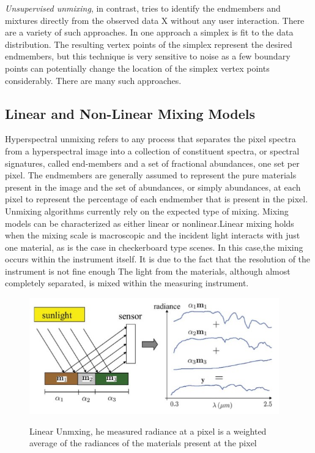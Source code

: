 \documentclass[12pt]{svproc}
\begin{document}
\emph{Unsupervised unmixing}, in contrast, tries to identify the endmembers and mixtures directly from the observed data X without any user interaction. There are a variety of such approaches. In one approach a simplex is fit to the data distribution. The resulting vertex points of the simplex represent the desired endmembers, but this technique is very sensitive to noise as a few boundary points can potentially change the location of the simplex vertex points considerably. There are many such approaches.

\subsection{Linear and Non-Linear Mixing Models}
Hyperspectral unmixing refers to any process that separates the pixel spectra from a hyperspectral image into a collection of constituent spectra, or spectral signatures, called end-members and a set of fractional abundances, one set per pixel. The endmembers are generally assumed to represent the pure materials present in the image and the set of abundances, or simply abundances, at each pixel to represent the percentage of each endmember that is present in the pixel.\\

Unmixing algorithms currently rely on the expected type of mixing. Mixing models can be characterized as either linear or nonlinear.Linear mixing holds when the mixing scale is macroscopic and the incident light interacts with just one material, as is the case in checkerboard type scenes. In this case,the mixing occurs within the instrument itself.  It is due to the fact that the resolution of the instrument is not fine enough The light from the materials, although almost completely separated, is mixed within the measuring instrument.

 \graphicspath{ {./figures/} }
 
 	\begin{figure}{}
 		\includegraphics[width=0.9\linewidth, height=5cm]{Picture2} 
 		\label{fig:subim1}
 		\centering
 		 	\caption{Linear Unmxing, he measured radiance at a pixel is a weighted average of the radiances of the materials present at the pixel}
 	\end{figure}
 
\end{document}
